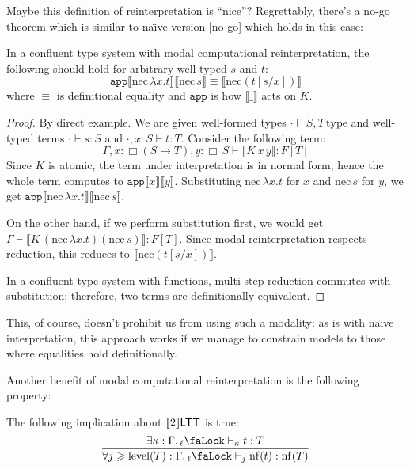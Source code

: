 Maybe this definition of reinterpretation is ``nice''?
Regrettably, there's a no-go theorem which is similar to
na\"{\i}ve version \ref{no-go} which holds in this case:

\begin{theorem}
    In a confluent type system with modal computational
    reinterpretation, the following should hold for
    arbitrary well-typed $s$ and $t$:
    \[
        \mathtt{app}\llbracket\mathrm{nec}\,\lambda x.t
        \rrbracket\llbracket\mathrm{nec}\,s\rrbracket
        \equiv\llbracket\mathrm{nec}(t[s/x])
        \rrbracket
    \]
    where $\equiv$ is definitional equality and
    $\mathtt{app}$ is how $\llbracket\_\rrbracket$
    acts on $K$.
\end{theorem}

\begin{proof}
    By direct example. We are given well-formed types
    $\cdot\vdash S,T\,\mathrm{type}$ and well-typed
    terms $\cdot\vdash s:S$ and $\cdot,x:S\vdash t:T$.
    Consider the following term:
    \[
        \Gamma,x:\Box(S\to T),y:\Box\,S\vdash
            \llbracket K\,x\,y\rrbracket:F[T]
    \]
    Since $K$ is atomic, the term under interpretation is in
    normal form; hence the whole term computes to
    $\mathtt{app}\llbracket x\rrbracket \llbracket y
    \rrbracket$. Substituting $\mathrm{nec}\,
    \lambda x.t$ for $x$ and $\mathrm{nec}\,s$ for $y$,
    we get $\mathtt{app}\llbracket\mathrm{nec}\,
    \lambda x.t\rrbracket\llbracket\mathrm{nec}\,
    s\rrbracket$.

    On the other hand, if we perform substitution first,
    we would get $\Gamma\vdash\llbracket K\,
    (\mathrm{nec}\,\lambda x.t)(\mathrm{nec}\,s)
    \rrbracket:F[T]$. Since modal reinterpretation
    respects reduction, this reduces to
    $\llbracket\mathrm{nec}(t[s/x])\rrbracket$.

    In a confluent type system with functions,
    multi-step reduction commutes with substitution;
    therefore, two terms are definitionally equivalent.
\end{proof}

This, of course, doesn't prohibit us from using such a
modality: as is with na\"{\i}ve interpretation, this
approach works if we manage to constrain models to those
where equalities hold definitionally.

Another benefit of modal computational reinterpretation
is the following property:

\begin{theorem}
    The following implication about $\llbracket 2\rrbracket\mathsf{LTT}$ is true:
    \[\dfrac{
        \exists\kappa:
        \Gamma.\,{}_\ell\text{\faLock}\vdash_\kappa
        t:T
    }{\forall j\geqslant\mathrm{level}(T):
        \Gamma.\,{}_\ell\text{\faLock}\vdash_j
    \mathrm{nf}(t):\mathrm{nf}(T)}\]
\end{theorem}

